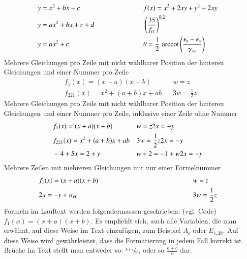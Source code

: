 %
\begin{alignat}{2} %
&y = x^2 + bx + c     \hspace{29mm} && f(x) = x^2 + 2xy + y^2+2xy   \label{Formellabel10}\\
&y = ax^2 + bx + c + d              &&  \left(\frac{35}{f_{cc}}\right)^{0.2}     \label{Formellabel11}\\
&y = ax^2 + c                       && \theta = \frac{1}{2} \, \arccot \left( \frac{\epsilon_y - \epsilon_x}{\gamma_{xy}} \right)   \label{Formellabel11b}
\end{alignat}
%
Mehrere Gleichungen pro Zeile mit nicht wählbarer Position der hinteren Gleichungen und einer Nummer pro Zeile%
%
\begin{align}
&f_1(x) = (x+a)(x+b)                   &  &w =z  \label{Formellabel12} \\            
&f_{221}(x)= x^2 + (a+b)x + ab         &  &3w=\frac{1}{2}z \label{Formellabel13}      
\end{align}
%
Mehrere Gleichungen pro Zeile mit nicht wählbarer Position der hinteren Gleichungen und einer Nummer pro Zeile, inklusive einer Zeile ohne Nummer%
%
\begin{align}
&f_1(x) = (x+a)(x+b)           &  &w =z2x=-y  \label{Formellabel15} \\            
&f_{221}(x)= x^2 + (a+b)x + ab         &  &3w=\frac{1}{2}z2x=-y  \notag\\
&-4 + 5x=2+y   &  &w+2=-1+w2x=-y   \label{Formellabel16}         
\end{align}
%
Mehrere Zeilen mit mehreren Gleichungen mit nur einer Formelnummer%
%
\begin{equation}
\begin{aligned}
&f_1(x) = (x+a)(x+b)    \hspace{45mm}       &  &w =z  \\  
&2x=-y+\alpha_H                         &  &3w=\frac{1}{2}z 
\end{aligned}
\label{Formellabel17}
\end{equation}
%
Formeln im Lauftext werden folgendermassen geschrieben: (vgl. Code) $f_1(x) = (x+a)(x+b)$. Es empfiehlt sich, auch alle Variablen, die man erwähnt, auf diese Weise im Text einzufügen, zum Beispiel $A_c$ oder $E_{c,28}$. Auf diese Weise wird gewährleistet, dass die Formatierung in jedem Fall korrekt ist. Brüche im Text stellt man entweder so: $\sfrac{b+c}{\alpha}$, oder so $\frac{b+c}{\alpha}$ dar.%
%
